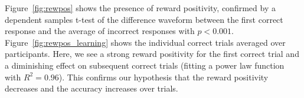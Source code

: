 Figure~\ref{fig:rewpos} shows the presence of reward positivity, confirmed by a 
dependent samples t-test of the difference waveform between the first correct 
response and the average of incorrect responses with $p < 0.001$.  
Figure~\ref{fig:rewpos_learning} shows the individual correct trials averaged 
over participants. Here, we see a strong reward positivity for the first 
correct trial and a diminishing effect on subsequent correct trials (fitting a 
power law function with $R^2 = 0.96$). This confirms our hypothesis that the 
reward positivity decreases and the \tvt accuracy increases over trials.